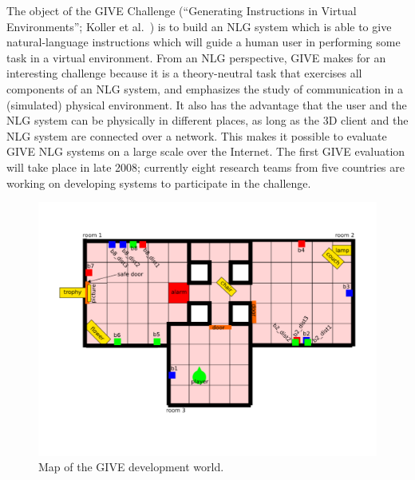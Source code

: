 The object of the GIVE Challenge (``Generating Instructions in Virtual
Environments''; Koller et al.\
\citeyear{alexander07:_shared_task_propos}) is to build an NLG system
which is able to give natural-language instructions which will guide a
human user in performing some task in a virtual environment.  From an
NLG perspective, GIVE makes for an interesting challenge because it is
a theory-neutral task that exercises all components of an NLG system,
and emphasizes the study of communication in a (simulated) physical
environment.  It also has the advantage that the user and the NLG
system can be physically in different places, as long as the 3D client
and the NLG system are connected over a network.  This makes it
possible to evaluate GIVE NLG systems on a large scale over the
Internet.  The first GIVE evaluation will take place in late 2008;
currently eight research teams from five countries are working on
developing systems to participate in the challenge.

\begin{figure}
\centering
\includegraphics[width=1 \columnwidth]{give_world_no_expl}
\caption{Map of the GIVE development world.}
  \label{fig:give-development-world}
\end{figure}

